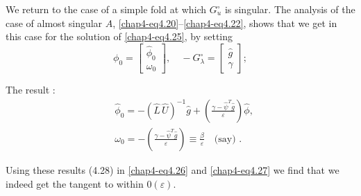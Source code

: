  We return to the case of a simple fold at which $G^\circ_u$
 is singular. The analysis of the case of almost singular $A$,
\eqref{chap4-eq4.20}--\eqref{chap4-eq4.22}, shows  that we get in this
case for the solution of 
\eqref{chap4-eq4.25}, by setting  
  \begin{equation*}
\phi_0 = 
\begin{bmatrix}
\hat {\phi}_0\\
\omega _0
\end{bmatrix}
, \quad -G^\circ_\lambda=
\begin{bmatrix}
\hat{g}\\
\gamma
\end{bmatrix} 
;\tag{4.28a}\label{chap4-eq4.28a}
 \end{equation*} 
 
 The result :
 \begin{equation*}
\begin{split}
& \hat{\phi}_0 = - (\hat{L} \, \hat{U}) ^{-1}\hat{g}+
\left(\frac{\gamma -\hat {\psi}^T \hat {g}}{\varepsilon } \right)
\hat {\phi},\\ 
& \omega_0 = - \left(\frac{\gamma- \hat{\psi}^T \hat{g}}{\varepsilon
 } \right) \equiv \frac{\beta}{\varepsilon }\quad  \text{(say)
 }. 
\end{split}\tag{4.28b}\label{chap4-eq4.28b} 
 \end{equation*}
 
Using these results (4.28) in \eqref{chap4-eq4.26} and
\eqref{chap4-eq4.27} we find that we 
 indeed get the tangent to within $0(\varepsilon)$. 
